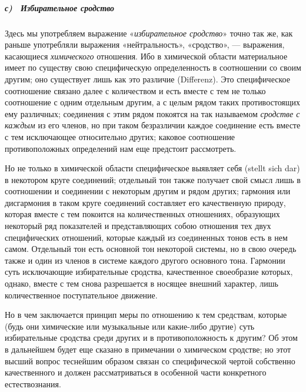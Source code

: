 \subparagraph[с) \ Избирательное сродство]{с) \ Избирательное сродство}
\hypertarget{Toc478978684}{}Здесь мы употребляем выражение
«{\em избирательное сродство}» точно так же, как раньше
употребляли выражения «нейтральность», «сродство», — выражения, касающиеся
{\em химического} отношения. Ибо в химической области
материальное имеет по существу свою специфическую определенность в
соотношении со своим другим; оно существует лишь как это различие
(Differenz). Это специфическое соотношение связано далее с количеством и
есть вместе с тем не только соотношение с одним отдельным другим, а с целым
рядом таких противостоящих ему различных; соединения с этим рядом покоятся
на так называемом {\em сродстве с каждым} из его
членов, но при таком безразличии каждое соединение есть вместе с тем
исключающее относительно других; каковое соотношение противоположных
определений нам еще предстоит рассмотреть.

Но не только в химической области специфическое выявляет себя (stellt sich
dar) в некотором круге соединений; отдельный тон также получает свой смысл
лишь в соотношении и соединении с некоторым другим и рядом других; гармония
или дисгармония в таком круге соединений составляет его качественную
природу, которая вместе с тем покоится на количественных отношениях,
образующих некоторый ряд показателей и представляющих собою отношения тех
двух специфических отношений, которые каждый из соединенных тонов есть в
нем самом. Отдельный тон есть основной тон некоторой системы, но в свою
очередь также и один из членов в системе каждого другого основного тона.
Гармонии суть исключающие избирательные сродства, качественное своеобразие
которых, однако, вместе с тем снова разрешается в носящее внешний характер,
лишь количественное поступательное движение.

Но в чем заключается принцип меры по отношению к тем средствам, которые
(будь они химические или музыкальные или какие-либо другие) суть
избирательные сродства среди других и в противоположность к другим? Об этом
в дальнейшем будет еще сказано в примечании о химическом сродстве; но этот
высший вопрос теснейшим образом связан со специфической чертой собственно
качественного и должен рассматриваться в особенной части конкретного
естествознания.

